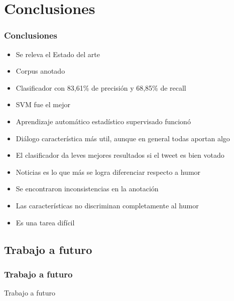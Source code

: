 \section{Conclusiones}

\begin{frame}
    \frametitle{Conclusiones}
    
    \begin{itemize}[<+->]
    	\item[\checkmark] Se releva el Estado del arte
    	\item[\checkmark] Corpus anotado
    	\item[\checkmark] Clasificador con 83,61\% de precisión y 68,85\% de recall
    	\item[\checkmark] SVM fue el mejor
    	\item[\checkmark] Aprendizaje automático estadístico supervisado funcionó
    	\item[\checkmark] Diálogo característica más util, aunque en general todas aportan algo
    	\item[\checkmark] El clasificador da leves mejores resultados si el tweet es bien votado
    	\item[\checkmark] Noticias es lo que más se logra diferenciar respecto a humor
    	\item[\checkmark] Se encontraron inconsistencias en la anotación
    	\item[\checkmark] Las características no discriminan completamente al humor
    	\item[\checkmark] Es una tarea difícil
    \end{itemize}
\end{frame}

\subsection{Trabajo a futuro}
\begin{frame}
    \frametitle{Trabajo a futuro}
    Trabajo a futuro
\end{frame}
